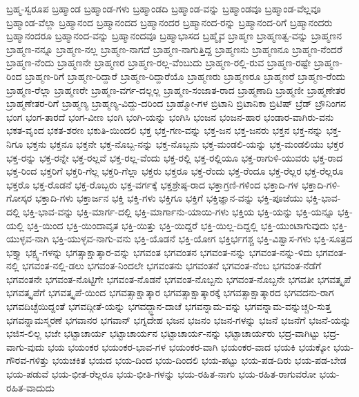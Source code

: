 {ಬ್ರಹ್ಮ-ಸ್ವರೂಪ
ಬ್ರಹ್ಮಾಂಡ
ಬ್ರಹ್ಮಾಂಡ-ಗಳು
ಬ್ರಹ್ಮಾಂಡದಿ
ಬ್ರಹ್ಮಾಂಡ-ವನ್ನು
ಬ್ರಹ್ಮಾಂಡವೂ
ಬ್ರಹ್ಮಾಂಡ-ವೆಲ್ಲವೂ
ಬ್ರಹ್ಮಾಂಡ-ವೆಲ್ಲಾ
ಬ್ರಹ್ಮಾನಂದ
ಬ್ರಹ್ಮಾನಂದದ
ಬ್ರಹ್ಮಾನಂದರ
ಬ್ರಹ್ಮಾನಂದ-ರನ್ನು
ಬ್ರಹ್ಮಾನಂದ-ರಿಗೆ
ಬ್ರಹ್ಮಾನಂದರು
ಬ್ರಹ್ಮಾನಂದರೂ
ಬ್ರಹ್ಮಾನಂದ-ವನ್ನು
ಬ್ರಹ್ಮಾನಂದವೂ
ಬ್ರಹ್ಮಾಭಾಸದ
ಬ್ರಹ್ಮೈವ
ಬ್ರಾಹ್ಮಣ
ಬ್ರಾಹ್ಮಣತ್ವ-ವನ್ನು
ಬ್ರಾಹ್ಮಣನ
ಬ್ರಾಹ್ಮಣ-ನನ್ನೂ
ಬ್ರಾಹ್ಮಣ-ನಲ್ಲ
ಬ್ರಾಹ್ಮಣ-ನಾಗದೆ
ಬ್ರಾಹ್ಮಣ-ನಾಗುತ್ತಿದ್ದ
ಬ್ರಾಹ್ಮಣನು
ಬ್ರಾಹ್ಮಣನೂ
ಬ್ರಾಹ್ಮಣ-ನೆಂದರೆ
ಬ್ರಾಹ್ಮಣ-ನೆಂದು
ಬ್ರಾಹ್ಮಣನೇ
ಬ್ರಾಹ್ಮಣರ
ಬ್ರಾಹ್ಮಣ-ರಲ್ಲ-ವೆಂಬುದು
ಬ್ರಾಹ್ಮಣ-ರಲ್ಲಿ-ರುವ
ಬ್ರಾಹ್ಮಣ-ರಷ್ಟೇ
ಬ್ರಾಹ್ಮಣ-ರಿಂದ
ಬ್ರಾಹ್ಮಣ-ರಿಗೆ
ಬ್ರಾಹ್ಮಣ-ರಿದ್ದಾರೆ
ಬ್ರಾಹ್ಮಣ-ರಿದ್ದಾರೆಯೊ
ಬ್ರಾಹ್ಮಣರು
ಬ್ರಾಹ್ಮಣರೂ
ಬ್ರಾಹ್ಮಣರೆ
ಬ್ರಾಹ್ಮಣ-ರೆಂದು
ಬ್ರಾಹ್ಮಣ-ರೆಲ್ಲಾ
ಬ್ರಾಹ್ಮಣರೇ
ಬ್ರಾಹ್ಮಣ-ವರ್ಗ-ದಲ್ಲಲ್ಲ
ಬ್ರಾಹ್ಮಣ-ಸಂಜಾತ-ರಾದ
ಬ್ರಾಹ್ಮಣಾದಿ
ಬ್ರಾಹ್ಮಣೀ
ಬ್ರಾಹ್ಮಣೇತರ
ಬ್ರಾಹ್ಮಣೇತರ-ರಿಗೆ
ಬ್ರಾಹ್ಮಣ್ಯ
ಬ್ರಾಹ್ಮಣ್ಯ-ವಿದ್ದು-ದರಿಂದ
ಬ್ರಾಹ್ಮೋ-ಗಳ
ಬ್ರಿಟಾನಿ
ಬ್ರಿಟಾನಿಕಾ
ಬ್ರಿಟಿಷ್
ಬ್ರೆಡ್
ಬ್ರೌನಿಂಗನ
ಭಂಗ
ಭಂಗ-ತಾರದೆ
ಭಂಗ-ವೀಣ
ಭಂಗಿ
ಭಂಗಿ-ಯನ್ನು
ಭಂಗಿಸಿ
ಭಂಜನ
ಭಂಜನ-ಹಾರ
ಭಂಡಾರ-ವಾಗಿರು-ವನು
ಭಕತ-ವೃಂದ
ಭಕತ-ಶರಣ
ಭಕುತಿ-ಯಿಂದಲಿ
ಭಕ್ತ
ಭಕ್ತ-ಗಣ-ವನ್ನು
ಭಕ್ತ-ಜನ
ಭಕ್ತ-ಜನರು
ಭಕ್ತನ
ಭಕ್ತ-ನನ್ನು
ಭಕ್ತ-ನಿಗೂ
ಭಕ್ತನು
ಭಕ್ತನೂ
ಭಕ್ತನೇ
ಭಕ್ತ-ನೊಬ್ಬ-ನನ್ನು
ಭಕ್ತ-ನೊಬ್ಬನು
ಭಕ್ತ-ಮಂಡಲಿ-ಯನ್ನು
ಭಕ್ತ-ಮಂಡಲಿಯು
ಭಕ್ತರ
ಭಕ್ತ-ರನ್ನು
ಭಕ್ತ-ರನ್ನೇ
ಭಕ್ತ-ರಲ್ಲವೆ
ಭಕ್ತ-ರಲ್ಲ-ವೆಂದು
ಭಕ್ತ-ರಲ್ಲಿ
ಭಕ್ತ-ರಲ್ಲಿಯೂ
ಭಕ್ತ-ರಾಗುಳಿ-ಯುವರು
ಭಕ್ತ-ರಾದ
ಭಕ್ತ-ರಿಂದ
ಭಕ್ತರಿಗೆ
ಭಕ್ತರಿ-ಗೆಲ್ಲ
ಭಕ್ತರಿ-ಗೆಲ್ಲಾ
ಭಕ್ತರು
ಭಕ್ತರೂ
ಭಕ್ತ-ರೆಂದು
ಭಕ್ತ-ರೆಂದೂ
ಭಕ್ತ-ರೆಲ್ಲರ
ಭಕ್ತ-ರೆಲ್ಲರೂ
ಭಕ್ತರೊ
ಭಕ್ತ-ರೊಡನೆ
ಭಕ್ತ-ರೊಬ್ಬರು
ಭಕ್ತ-ವರ್ಗಕ್ಕೆ
ಭಕ್ತಶ್ರೇಷ್ಠ-ರಾದ
ಭಕ್ತಾಗ್ರಣಿ-ಗಳಿಂದ
ಭಕ್ತಾದಿ-ಗಳ
ಭಕ್ತಾದಿ-ಗಳಿ-ಗೋಸ್ಕರ
ಭಕ್ತಾದಿ-ಗಳು
ಭಕ್ತಾರ್ಜನ
ಭಕ್ತಿ
ಭಕ್ತಿ-ಗಳು
ಭಕ್ತಿಗೂ
ಭಕ್ತಿಗೆ
ಭಕ್ತಿಜ್ಞಾನ-ವನ್ನು
ಭಕ್ತಿ-ಪೂಜೆಯು
ಭಕ್ತಿ-ಭಾವ-ದಲ್ಲಿ
ಭಕ್ತಿ-ಭಾವ-ವನ್ನು
ಭಕ್ತಿ-ಮಾರ್ಗ-ದಲ್ಲಿ
ಭಕ್ತಿ-ಮಾರ್ಗಾನು-ಯಾಯಿ-ಗಳು
ಭಕ್ತಿಯ
ಭಕ್ತಿ-ಯನ್ನು
ಭಕ್ತಿ-ಯನ್ನೂ
ಭಕ್ತಿ-ಯಲ್ಲಿ
ಭಕ್ತಿ-ಯಿಂದ
ಭಕ್ತಿ-ಯಿಂದಾವೃತ
ಭಕ್ತಿ-ಯಿತ್ತು
ಭಕ್ತಿ-ಯಿದ್ದರೆ
ಭಕ್ತಿ-ಯಿಲ್ಲ-ದಿದ್ದಲ್ಲಿ
ಭಕ್ತಿ-ಯುಂಟಾಗುವುದು
ಭಕ್ತಿ-ಯುಳ್ಳವ-ನಾಗಿ
ಭಕ್ತಿ-ಯುಳ್ಳವ-ನಾಗು-ವನು
ಭಕ್ತಿ-ಯೊಡನೆ
ಭಕ್ತಿ-ಯೋಗ
ಭಕ್ತಿರ್ಭಗಶ್ಚ
ಭಕ್ತಿ-ವಿಶ್ವಾಸ-ಗಳು
ಭಕ್ತಿ-ಸೂತ್ರದ
ಭಕ್ತ್ಯಾ
ಭಕ್ಷ್ಯ-ಗಳನ್ನು
ಭಗತ್ಸಾಕ್ಷಾತ್ಕಾರ-ವನ್ನು
ಭಗವಂತ
ಭಗವಂತನ
ಭಗವಂತ-ನನ್ನು
ಭಗವಂತ-ನನ್ನು-ಳಿದು
ಭಗವಂತ-ನಲ್ಲಿ
ಭಗವಂತ-ನಲ್ಲಿ-ಡಲು
ಭಗವಂತ-ನಿಂದಲೇ
ಭಗವಂತನು
ಭಗವಂತನೆ
ಭಗವಂತ-ನೆಂಬ
ಭಗವಂತ-ನೆಡೆಗೆ
ಭಗವಂತನೇ
ಭಗವಂತ-ನೊಟ್ಟಿಗೇ
ಭಗವಂತ-ನೊಡನೆ
ಭಗವಂತ-ನೊಬ್ಬನು
ಭಗವಂತ-ನೊಬ್ಬನೇ
ಭಗವತೀ
ಭಗವತ್ಕೃಪೆ
ಭಗವತ್ಕೃಪೆಗೆ
ಭಗವತ್ಕೃಪೆ-ಯಿಂದ
ಭಗವತ್ಸಾಕ್ಷಾತ್ಕಾರ
ಭಗವತ್ಸಾಕ್ಷಾತ್ಕಾರಕ್ಕೆ
ಭಗವತ್ಸಾಕ್ಷಾತ್ಕಾರದ
ಭಗವದನು-ರಾಗ
ಭಗವದಿಚ್ಛೆಯಿದ್ದಂತೆ
ಭಗವದ್ಗೀತೆ-ಯನ್ನು
ಭಗವದ್ಜ್ಞಾನ-ದಾಚೆ
ಭಗವನ್ನಾಮ-ವನ್ನು
ಭಗವನ್ನಾಮ-ವನ್ನುಚ್ಚರಿ-ಸುತ್ತ
ಭಗವನ್ನಾಮಸ್ಮರಣೆ
ಭಗವಾನರ
ಭಗವಾನ್
ಭಗ್ನದೇಹ
ಭಜನ
ಭಜನಂ
ಭಜನ-ಗಳನ್ನು
ಭಜನೆ
ಭಜನೆಗೆ
ಭಜನೆ-ಯನ್ನು
ಭಜಿಸ-ಲಿಲ್ಲ
ಭಜೇ
ಭಟ್ಟಾಚಾರ್ಯ
ಭಟ್ಟಾಚಾರ್ಯನ
ಭಟ್ಟಾಚಾರ್ಯ-ನನ್ನು
ಭಟ್ಟಾಚಾರ್ಯರು
ಭದ್ರ-ವಾಗಿಟ್ಟು
ಭದ್ರ-ವಾಗು-ವುದು
ಭಯ
ಭಯಂಕರ
ಭಯಂಕರ-ಭಾವ-ಗಳ
ಭಯಂಕರ-ವಾಗಿ
ಭಯಂಕರ-ವಾದ
ಭಯಕಿ
ಭಯಕ್ಕೋ
ಭಯ-ಗೌರವ-ಗಳಿತ್ತು
ಭಯಚಕಿತ
ಭಯದ
ಭಯ-ದಿಂದ
ಭಯ-ದಿಂದಲಿ
ಭಯ-ಪಟ್ಟು
ಭಯ-ಪಡ-ದಿರು
ಭಯ-ಪಡ-ಬೇಡ
ಭಯ-ಪಡುವೆ
ಭಯ-ಭೀತ-ರೆಲ್ಲರೂ
ಭಯ-ಭೀತಿ-ಗಳನ್ನು
ಭಯ-ರಹಿತ-ನಾಗು
ಭಯ-ರಹಿತ-ರಾಗುವರೋ
ಭಯ-ರಹಿತ-ವಾದುದು
}
